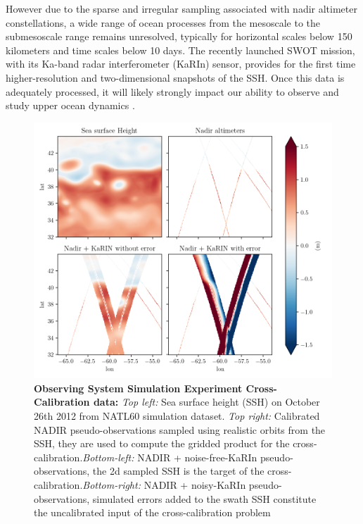 \begin{bibunit}
However due to the sparse and irregular sampling associated with nadir altimeter constellations, a wide range of ocean processes from the mesoscale to the submesoscale range remains unresolved, typically for horizontal scales below 150 kilometers and time scales below 10 days. 
The recently launched SWOT mission, with its Ka-band radar interferometer (KaRIn) sensor, provides for the first time higher-resolution and two-dimensional snapshots of the SSH. Once this data is adequately processed, it will likely strongly impact our ability to observe and study upper ocean dynamics \cite{Peral_Esteban-Fernandez_2018}. 

\begin{figure}[!t]
    \begin{center}
        \includegraphics[width=\linewidth]{00_Calib/gridded_sensors.png}
    \end{center}
    \caption{\textbf{Observing System Simulation Experiment Cross-Calibration data:} \textit{Top left:} Sea surface height (SSH) on October 26th 2012 from NATL60 simulation dataset. \textit{Top right:} Calibrated NADIR pseudo-observations sampled using realistic orbits from the SSH, they are used to compute the gridded product for the cross-calibration.\textit{Bottom-left:} NADIR + noise-free-KaRIn pseudo-observations, the  2{\sc d} sampled SSH is the target of the cross-calibration.\textit{Bottom-right:} NADIR + noisy-KaRIn pseudo-observations, simulated errors added to the swath SSH constitute the uncalibrated input of the cross-calibration problem}
\label{fig:gridded}
\end{figure}


\end{bibunit}
